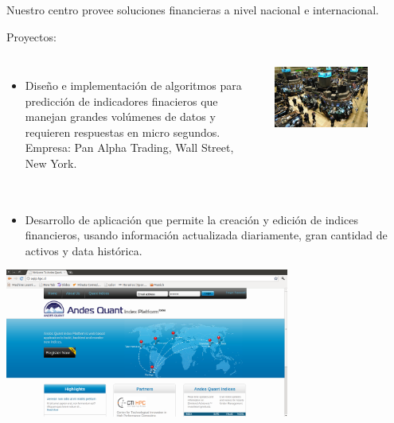 \frame
{
\frametitle{}

Nuestro centro provee soluciones financieras a nivel nacional e internacional.

Proyectos:


\begin{columns}
\begin{itemize}
\item Diseño e implementación de algoritmos para predicción de indicadores finacieros que manejan grandes volúmenes de datos y requieren respuestas en micro segundos. Empresa: Pan Alpha Trading, Wall Street, New York.
\end{itemize}
\includegraphics[width=0.7\textwidth]{img/wallstreet}
\end{columns}

}

\frame
{
\frametitle{}

\begin{itemize}
\item Desarrollo de aplicación que permite la creación y edición de indices financieros, usando información actualizada diariamente, gran cantidad de activos y data histórica.
\end{itemize}
\begin{center}
 \includegraphics[width=0.7\textwidth]{img/ETF}
\end{center}





}

